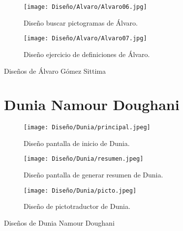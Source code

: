 \begin{figure}[ht!]
  \ContinuedFloat

  \begin{subfigure}{\textwidth}
    \centering
    \texttt{[image: Diseño/Alvaro/Alvaro06.jpg]}
    \caption{Diseño buscar pictogramas de Álvaro.}
    \label{fig:disenyoAlvaro06}
  \end{subfigure}

  \begin{subfigure}{\textwidth}
    \centering
    \texttt{[image: Diseño/Alvaro/Alvaro07.jpg]}
    \caption{Diseño ejercicio de definiciones de Álvaro.}
    \label{fig:disenyoAlvaro07}
  \end{subfigure}

  \caption{Diseños de Álvaro Gómez Sittima}
  \label{fig:disenyoAlvaro}
\end{figure}


\begin{figure}[ht!]
  \section{Dunia Namour Doughani}
  \label{sec:disenyoDunia}
  \begin{subfigure}{\textwidth}
    \centering
    \texttt{[image: Diseño/Dunia/principal.jpeg]}
    \caption{Diseño pantalla de inicio de Dunia.}
    \label{dunia1}
  \end{subfigure}

  \begin{subfigure}{\textwidth}
    \centering
    \texttt{[image: Diseño/Dunia/resumen.jpeg]}
    \caption{Diseño pantalla de generar resumen de Dunia.}
    \label{dunia2}
  \end{subfigure}

  \begin{subfigure}{\textwidth}
    \centering
    \texttt{[image: Diseño/Dunia/picto.jpeg]}
    \caption{Diseño de pictotraductor de Dunia.}
    \label{dunia3}
  \end{subfigure}

  \caption{Diseños de Dunia Namour Doughani}
  \label{fig:disenyoDunia}
\end{figure}

